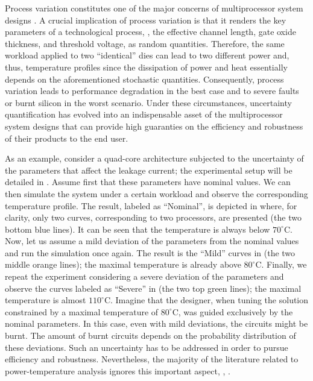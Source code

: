 Process variation constitutes one of the major concerns of multiprocessor system designs \cite{chandrakasan2001, srivastava2010}.
A crucial implication of process variation is that it renders the key parameters of a technological process, \eg, the effective channel length, gate oxide thickness, and threshold voltage, as random quantities.
Therefore, the same workload applied to two ``identical'' dies can lead to two different power and, thus, temperature profiles since the dissipation of power and heat essentially depends on the aforementioned stochastic quantities.
Consequently, process variation leads to performance degradation in the best case and to severe faults or burnt silicon in the worst scenario.
Under these circumstances, uncertainty quantification \cite{xiu2010, maitre2010} has evolved into an indispensable asset of the multiprocessor system designs that can provide high guaranties on the efficiency and robustness of their products to the end user.


As an example, consider a quad-core architecture subjected to the uncertainty of the parameters that affect the leakage current; the experimental setup will be detailed in .
Assume first that these parameters have nominal values. We can then simulate the system under a certain workload and observe the corresponding temperature profile.
The result, labeled as ``Nominal'', is depicted in  where, for clarity, only two curves, corresponding to two processors, are presented (the two bottom blue lines). It can be seen that the temperature is always below $70^{\circ}$C. Now, let us assume a mild deviation of the parameters from the nominal values and run the simulation once again.
The result is the ``Mild'' curves in  (the two middle orange lines); the maximal temperature is already above $80^{\circ}$C.
Finally, we repeat the experiment considering a severe deviation of the parameters and observe the curves labeled as ``Severe'' in  (the two top green lines); the maximal temperature is almost $110^{\circ}$C.
Imagine that the designer, when tuning the solution constrained by a maximal temperature of $80^\circ$C, was guided exclusively by the nominal parameters. In this case, even with mild deviations, the circuits might be burnt.
The amount of burnt circuits depends on the probability distribution of these deviations.
Such an uncertainty has to be addressed in order to pursue efficiency and robustness.
Nevertheless, the majority of the literature related to power-temperature analysis ignores this important aspect, \eg, \cite{rao2009, rai2011, thiele2011, ukhov2012}.

